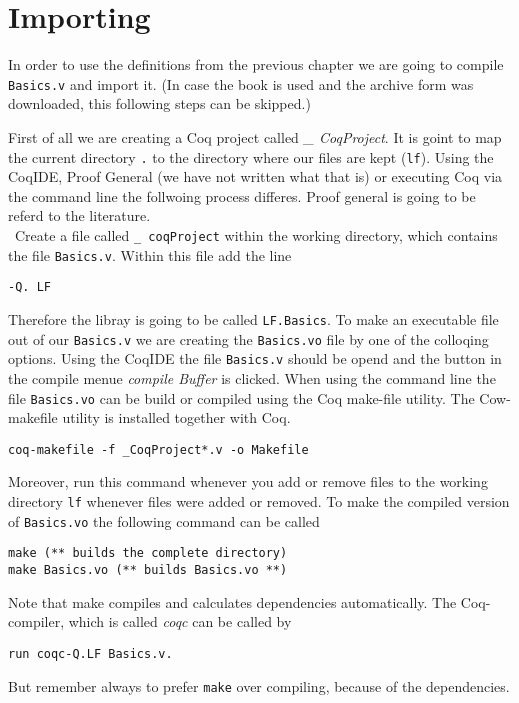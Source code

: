 \section{Importing}


In order to use the definitions from the previous chapter we are going to compile 
\texttt{Basics.v} and import it.
(In case the book \label{•} is used and the archive form was downloaded, this following steps can be skipped.)   

First of all we are creating a Coq project called {\itshape \_ CoqProject}.  
It is goint to map the current directory \texttt{.} to the directory where our files are kept (\texttt{lf}).
Using the CoqIDE, Proof General (we have not written what that is) or executing Coq via the command line the follwoing process differes.
Proof general is going to be referd to the literature.\\\
Create a file called \texttt{\_ coqProject} within the working directory, which contains the file \texttt{Basics.v}.
Within this file add the line 

\begin{lstlisting}
-Q. LF
\end{lstlisting}

Therefore the libray is going to be called \texttt{LF.Basics}. 
To make an executable file out of our \texttt{Basics.v} we are creating the \texttt{Basics.vo} file by one of the colloqing options.
Using the CoqIDE the file \texttt{Basics.v} should be opend and the button in the compile menue {\itshape compile Buffer} is clicked.
When using the command line the file \texttt{Basics.vo} can be build or compiled using the Coq  make-file utility.
The Cow-makefile utility is installed together with Coq.

\begin{lstlisting}
coq-makefile -f _CoqProject*.v -o Makefile
\end{lstlisting}

Moreover, run this command whenever you add or remove files to the  working directory  \texttt{lf} whenever files were added or removed.
To make the compiled version of \texttt{Basics.vo} the following command can be called
\begin{lstlisting}
make (** builds the complete directory)
make Basics.vo (** builds Basics.vo **)
\end{lstlisting}
Note that make compiles and calculates dependencies automatically. 
The Coq-compiler, which is called {\itshape coqc} can be called by 
\begin{lstlisting}
run coqc-Q.LF Basics.v.
\end{lstlisting}
But remember always to prefer \texttt{make} over compiling, because of the dependencies.\\
 
